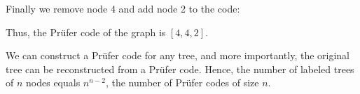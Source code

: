 Finally we remove node 4 and add node 2 to the code:
\begin{center}
\end{center}

Thus, the Prüfer code of the graph is $[4,4,2]$.

We can construct a Prüfer code for any tree,
and more importantly,
the original tree can be reconstructed
from a Prüfer code.
Hence, the number of labeled trees
of $n$ nodes equals
$n^{n-2}$, the number of Prüfer codes
of size $n$.
